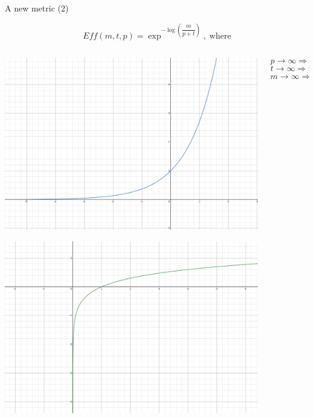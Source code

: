 \begin{frame}{A new metric (2)}
    
    \vspace{0.2cm}

    \begin{mdframed}[style=box]
        $$Eff(m,t,p) = \exp^{-\log \left( \dfrac{m}{p+t}\right)}, \;\text{where}$$
    \end{mdframed}
    
    \vspace{0.2cm}

    \begin{columns} %
        \begin{column}{0.5\textwidth}
            \center
            \includegraphics[scale=0.075]{img/exp.png}

            \includegraphics[scale = 0.075]{img/log.png}
        \end{column}
        \begin{column}{0.5\textwidth}
            \vspace{-1cm}
            \center
            $$p \to \infty \Rightarrow \text{metric}_{\text{new}} \to \infty$$
            $$t \to \infty \Rightarrow \text{metric}_{\text{new}} \to \infty$$
            $$m \to \infty \Rightarrow \text{metric}_{\text{new}} \to 0$$
        \end{column}
    \end{columns}
    
\end{frame}